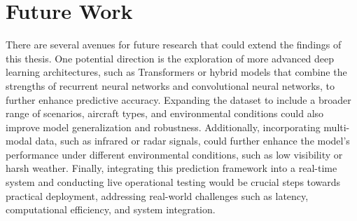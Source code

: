\documentclass[12pt,oneside]{book} %
\begin{document}
\section{Future Work}
There are several avenues for future research that could extend the findings of
this thesis. One potential direction is the exploration of more advanced deep
learning architectures, such as Transformers or hybrid models that combine the
strengths of recurrent neural networks and convolutional neural networks, to
further enhance predictive accuracy. Expanding the dataset to include a broader
range of scenarios, aircraft types, and environmental conditions could also
improve model generalization and robustness. Additionally, incorporating
multi-modal data, such as infrared or radar signals, could further enhance the
model’s performance under different environmental conditions, such as low
visibility or harsh weather. Finally, integrating this prediction framework
into a real-time system and conducting live operational testing would be
crucial steps towards practical deployment, addressing real-world challenges
such as latency, computational efficiency, and system integration.
\appendix




\end{document}
